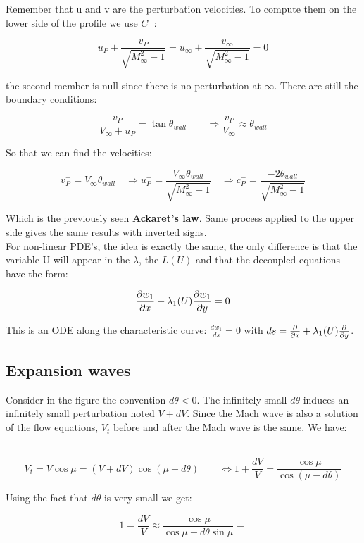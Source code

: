 	Remember that u and v are the perturbation velocities. To compute them on the lower side of the profile we use $C^-$: 
	
	\begin{equation}
	u_P + \frac{v_P}{\sqrt{M^2_\infty -1}} = u_\infty + \frac{v_\infty}{\sqrt{M^2_\infty -1}} = 0 
	\end{equation}
	
	the second member is null since there is no perturbation at $\infty$. There are still the boundary conditions: 
	
	\begin{equation}
	\frac{v_P}{V_\infty + u_P}= \tan \theta _{wall} \qquad \Rightarrow \frac{v_P}{V_\infty} \approx \theta _{wall}
	\end{equation}
	
	So that we can find the velocities:
	
	\begin{equation}
	v^-_P = V_\infty \theta^- _{wall} \quad \Rightarrow u_P^- = \frac{V_\infty\theta ^-_{wall}}{\sqrt{M_\infty ^2 - 1}} \quad \Rightarrow c_P^- = \frac{-2 \theta ^-_{wall}}{\sqrt{M_\infty ^2 - 1}}
	\end{equation}
	
	Which is the previously seen \textbf{Ackaret's law}. Same process applied to the upper side gives the same results with inverted signs. \\
	
	For non-linear PDE's, the idea is exactly the same, the only difference is that the variable U will appear in the $\lambda$, the $L(U)$ and that the decoupled equations have the form: 
	
	\begin{equation}
	\frac{\D w_1}{\D x} + \lambda _1(U) \frac{\D w_1}{\D y} = 0 
	\end{equation}
	
	This is an ODE along the characteristic curve: $\frac{dw_1}{ds} = 0$ with $ds = \frac{\D}{\D x} + \lambda_1(U) \frac{\D}{\D y}$.
	
\subsection{Expansion waves}
	Consider in the figure the convention $d\theta < 0$. The infinitely small $d\theta$ induces an infinitely small perturbation noted $V+dV$. Since the Mach wave is also a solution of the flow equations, $V_t$ before and after the Mach wave is the same. We have: 
	
	\ \\
	
	\begin{equation}
	V_t = V\cos \mu = (V+dV) \cos (\mu - d\theta) \qquad \Leftrightarrow 1+\frac{dV}{V} = \frac{\cos \mu }{\cos (\mu - d\theta)}
	\end{equation}
	
	Using the fact that $d\theta$ is very small we get: 
	
	\begin{equation}
	1=\frac{dV}{V} \approx \frac{\cos \mu }{\cos \mu + d\theta \sin \mu } = 
	\end{equation}
